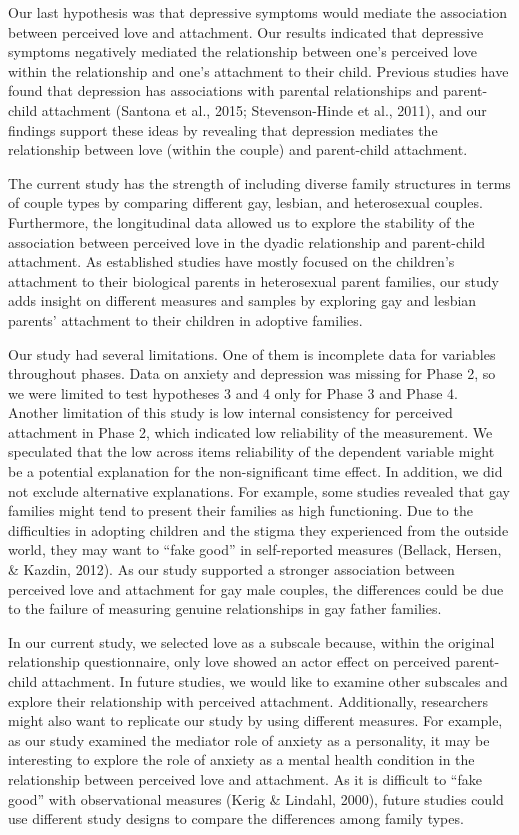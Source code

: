 \documentclass[man]{apa6}
\begin{document}
Our last hypothesis was that depressive symptoms would mediate the association between perceived love and attachment. Our results indicated that depressive symptoms negatively mediated the relationship between one's perceived love within the relationship and one's attachment to their child. Previous studies have found that depression has associations with parental relationships and parent-child attachment (Santona et al., 2015; Stevenson-Hinde et al., 2011), and our findings support these ideas by revealing that depression mediates the relationship between love (within the couple) and parent-child attachment.

The current study has the strength of including diverse family structures in terms of couple types by comparing different gay, lesbian, and heterosexual couples. Furthermore, the longitudinal data allowed us to explore the stability of the association between perceived love in the dyadic relationship and parent-child attachment. As established studies have mostly focused on the children's attachment to their biological parents in heterosexual parent families, our study adds insight on different measures and samples by exploring gay and lesbian parents' attachment to their children in adoptive families.

Our study had several limitations. One of them is incomplete data for variables throughout phases. Data on anxiety and depression was missing for Phase 2, so we were limited to test hypotheses 3 and 4 only for Phase 3 and Phase 4. Another limitation of this study is low internal consistency for perceived attachment in Phase 2, which indicated low reliability of the measurement. We speculated that the low across items reliability of the dependent variable might be a potential explanation for the non-significant time effect. In addition, we did not exclude alternative explanations. For example, some studies revealed that gay families might tend to present their families as high functioning. Due to the difficulties in adopting children and the stigma they experienced from the outside world, they may want to \enquote{fake good} in self-reported measures (Bellack, Hersen, \& Kazdin, 2012). As our study supported a stronger association between perceived love and attachment for gay male couples, the differences could be due to the failure of measuring genuine relationships in gay father families.

In our current study, we selected love as a subscale because, within the original relationship questionnaire, only love showed an actor effect on perceived parent-child attachment. In future studies, we would like to examine other subscales and explore their relationship with perceived attachment. Additionally, researchers might also want to replicate our study by using different measures. For example, as our study examined the mediator role of anxiety as a personality, it may be interesting to explore the role of anxiety as a mental health condition in the relationship between perceived love and attachment. As it is difficult to \enquote{fake good} with observational measures (Kerig \& Lindahl, 2000), future studies could use different study designs to compare the differences among family types.
\end{document}
